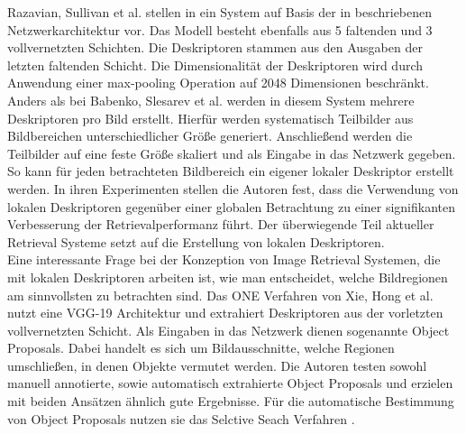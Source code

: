 Razavian, Sullivan et al. stellen in \cite{convnet} ein System auf Basis der in \cite{convnetarc} beschriebenen Netzwerkarchitektur vor. Das Modell besteht ebenfalls aus 5 faltenden und 3 vollvernetzten Schichten. Die Deskriptoren stammen aus den Ausgaben der letzten faltenden Schicht. Die Dimensionalität der Deskriptoren wird durch Anwendung einer max-pooling Operation auf 2048 Dimensionen beschränkt. Anders als bei Babenko, Slesarev et al. werden in diesem System mehrere Deskriptoren pro Bild erstellt. Hierfür werden systematisch Teilbilder aus Bildbereichen unterschiedlicher Größe generiert. Anschließend werden die Teilbilder auf eine feste Größe skaliert und als Eingabe in das Netzwerk gegeben. So kann für jeden betrachteten Bildbereich ein eigener lokaler Deskriptor erstellt werden. In ihren Experimenten stellen die Autoren fest, dass die Verwendung von lokalen Deskriptoren gegenüber einer globalen Betrachtung zu einer signifikanten Verbesserung der Retrievalperformanz führt. Der überwiegende Teil aktueller Retrieval Systeme setzt auf die Erstellung von lokalen Deskriptoren.
\\
Eine interessante Frage bei der Konzeption von Image Retrieval Systemen, die mit lokalen Deskriptoren arbeiten ist, wie man entscheidet, welche Bildregionen am sinnvollsten zu betrachten sind. Das ONE Verfahren \cite{one} von Xie, Hong et al. nutzt eine VGG-19 \cite{vgg} Architektur und extrahiert Deskriptoren aus der vorletzten vollvernetzten Schicht. Als Eingaben in das Netzwerk dienen sogenannte Object Proposals. Dabei handelt es sich um Bildausschnitte, welche Regionen umschließen, in denen Objekte vermutet werden. Die Autoren testen sowohl manuell annotierte, sowie automatisch extrahierte Object Proposals und erzielen mit beiden Ansätzen ähnlich gute Ergebnisse. Für die automatische Bestimmung von Object Proposals nutzen sie das Selctive Seach Verfahren \cite{selective_search}.
\\
